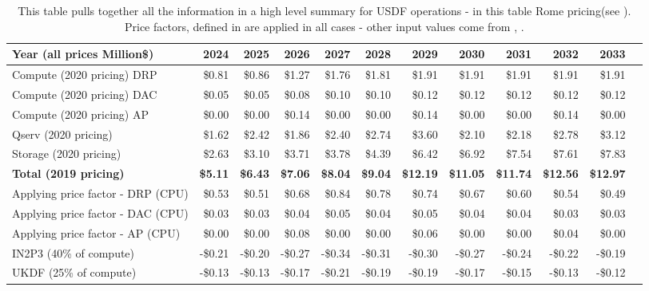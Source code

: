 \tiny \begin{longtable} { |p{}  |r  |r  |r  |r  |r  |r  |r  |r  |r  |r  |r |} 
\caption{This table pulls together all the information in a high level summary for USDF operations - in this table Rome pricing(see ). Price factors, defined in  are applied in all cases - other input values come from , .
 \label{tab:opsSumUSDF}}\\ 
\hline 
\textbf{Year  (all prices Million\$)}&\textbf{2024}&\textbf{2025}&\textbf{2026}&\textbf{2027}&\textbf{2028}&\textbf{2029}&\textbf{2030}&\textbf{2031}&\textbf{2032}&\textbf{2033} \\ \hline
{Compute (2020 pricing) DRP}&{\$0.81}&{\$0.86}&{\$1.27}&{\$1.76}&{\$1.81}&{\$1.91}&{\$1.91}&{\$1.91}&{\$1.91}&{\$1.91} \\ \hline
{Compute (2020 pricing) DAC}&{\$0.05}&{\$0.05}&{\$0.08}&{\$0.10}&{\$0.10}&{\$0.12}&{\$0.12}&{\$0.12}&{\$0.12}&{\$0.12} \\ \hline
{Compute (2020 pricing) AP}&{\$0.00}&{\$0.00}&{\$0.14}&{\$0.00}&{\$0.00}&{\$0.14}&{\$0.00}&{\$0.00}&{\$0.14}&{\$0.00} \\ \hline
{Qserv (2020 pricing)}&{\$1.62}&{\$2.42}&{\$1.86}&{\$2.40}&{\$2.74}&{\$3.60}&{\$2.10}&{\$2.18}&{\$2.78}&{\$3.12} \\ \hline
{Storage (2020 pricing)}&{\$2.63}&{\$3.10}&{\$3.71}&{\$3.78}&{\$4.39}&{\$6.42}&{\$6.92}&{\$7.54}&{\$7.61}&{\$7.83} \\ \hline
\textbf{Total (2019 pricing)}&\textbf{\$5.11}&\textbf{\$6.43}&\textbf{\$7.06}&\textbf{\$8.04}&\textbf{\$9.04}&\textbf{\$12.19}&\textbf{\$11.05}&\textbf{\$11.74}&\textbf{\$12.56}&\textbf{\$12.97} \\ \hline
{Applying price factor - DRP (CPU)}&{\$0.53}&{\$0.51}&{\$0.68}&{\$0.84}&{\$0.78}&{\$0.74}&{\$0.67}&{\$0.60}&{\$0.54}&{\$0.49} \\ \hline
{Applying price factor - DAC (CPU)}&{\$0.03}&{\$0.03}&{\$0.04}&{\$0.05}&{\$0.04}&{\$0.05}&{\$0.04}&{\$0.04}&{\$0.03}&{\$0.03} \\ \hline
{Applying price factor - AP (CPU)}&{\$0.00}&{\$0.00}&{\$0.08}&{\$0.00}&{\$0.00}&{\$0.06}&{\$0.00}&{\$0.00}&{\$0.04}&{\$0.00} \\ \hline
{IN2P3 (40\% of compute)}&{-\$0.21}&{-\$0.20}&{-\$0.27}&{-\$0.34}&{-\$0.31}&{-\$0.30}&{-\$0.27}&{-\$0.24}&{-\$0.22}&{-\$0.19} \\ \hline
{UKDF (25\% of compute)}&{-\$0.13}&{-\$0.13}&{-\$0.17}&{-\$0.21}&{-\$0.19}&{-\$0.19}&{-\$0.17}&{-\$0.15}&{-\$0.13}&{-\$0.12} \\ \hline

\end{longtable}
